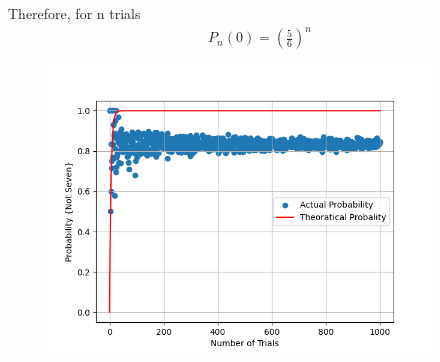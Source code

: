 \documentclass{beamer}
\begin{document}
    \begin{frame}
        Therefore, for n trials 
        \begin{align}
            P_n(0) = \left(\frac{5}{6}\right)^n
        \end{align}
    \end{frame}
\begin{frame}
    \begin{figure}[!ht]
        \includegraphics[width=4in, height=3in]{Figures/Figure_1.png}
    \end{figure}
\end{frame}
\end{document}
